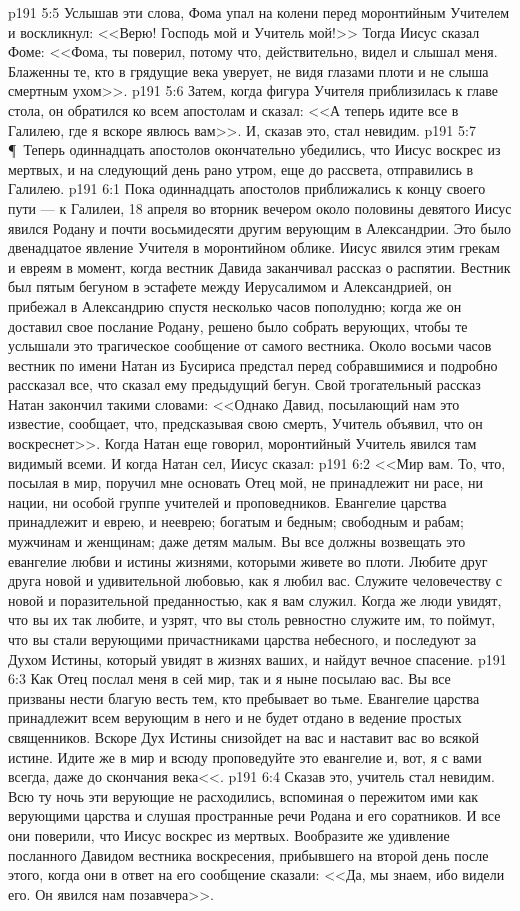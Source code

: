 \vs p191 5:5 Услышав эти слова, Фома упал на колени перед моронтийным Учителем и воскликнул: <<Верю! Господь мой и Учитель мой!>> Тогда Иисус сказал Фоме: <<Фома, ты поверил, потому что, действительно, видел и слышал меня. Блаженны те, кто в грядущие века уверует, не видя глазами плоти и не слыша смертным ухом>>.
\vs p191 5:6 Затем, когда фигура Учителя приблизилась к главе стола, он обратился ко всем апостолам и сказал: <<А теперь идите все в Галилею, где я вскоре явлюсь вам>>. И, сказав это, стал невидим.
\vs p191 5:7 \P\ Теперь одиннадцать апостолов окончательно убедились, что Иисус воскрес из мертвых, и на следующий день рано утром, еще до рассвета, отправились в Галилею.
\vs p191 6:1 Пока одиннадцать апостолов приближались к концу своего пути --- к Галилеи, 18 апреля во вторник вечером около половины девятого Иисус явился Родану и почти восьмидесяти другим верующим в Александрии. Это было двенадцатое явление Учителя в моронтийном облике. Иисус явился этим грекам и евреям в момент, когда вестник Давида заканчивал рассказ о распятии. Вестник был пятым бегуном в эстафете между Иерусалимом и Александрией, он прибежал в Александрию спустя несколько часов пополудню; когда же он доставил свое послание Родану, решено было собрать верующих, чтобы те услышали это трагическое сообщение от самого вестника. Около восьми часов вестник по имени Натан из Бусириса предстал перед собравшимися и подробно рассказал все, что сказал ему предыдущий бегун. Свой трогательный рассказ Натан закончил такими словами: <<Однако Давид, посылающий нам это известие, сообщает, что, предсказывая свою смерть, Учитель объявил, что он воскреснет>>. Когда Натан еще говорил, моронтийный Учитель явился там видимый всеми. И когда Натан сел, Иисус сказал:
\vs p191 6:2 <<Мир вам. То, что, посылая в мир, поручил мне основать Отец мой, не принадлежит ни расе, ни нации, ни особой группе учителей и проповедников. Евангелие царства принадлежит и еврею, и нееврею; богатым и бедным; свободным и рабам; мужчинам и женщинам; даже детям малым. Вы все должны возвещать это евангелие любви и истины жизнями, которыми живете во плоти. Любите друг друга новой и удивительной любовью, как я любил вас. Служите человечеству с новой и поразительной преданностью, как я вам служил. Когда же люди увидят, что вы их так любите, и узрят, что вы столь ревностно служите им, то поймут, что вы стали верующими причастниками царства небесного, и последуют за Духом Истины, который увидят в жизнях ваших, и найдут вечное спасение.
\vs p191 6:3 Как Отец послал меня в сей мир, так и я ныне посылаю вас. Вы все призваны нести благую весть тем, кто пребывает во тьме. Евангелие царства принадлежит всем верующим в него и не будет отдано в ведение простых священников. Вскоре Дух Истины снизойдет на вас и наставит вас во всякой истине. Идите же в мир и всюду проповедуйте это евангелие и, вот, я с вами всегда, даже до скончания века<<.
\vs p191 6:4 Сказав это, учитель стал невидим. Всю ту ночь эти верующие не расходились, вспоминая о пережитом ими как верующими царства и слушая пространные речи Родана и его соратников. И все они поверили, что Иисус воскрес из мертвых. Вообразите же удивление посланного Давидом вестника воскресения, прибывшего на второй день после этого, когда они в ответ на его сообщение сказали: <<Да, мы знаем, ибо видели его. Он явился нам позавчера>>.

